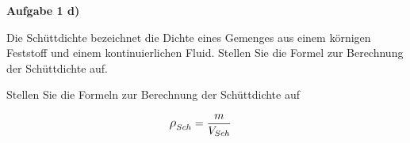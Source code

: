 \documentclass[aspectratio=169,9pt]{beamer}
\newcommand{\pp}{\par \vspace*{2mm}}
\newcommand{\antwort}[1]{
\begin{tcolorbox}[
	enhanced,
	colframe=unigrau!65,
	sharp corners,
	boxsep=1pt,
	colback=white,
	coltitle=black,
]
	#1
	\end{tcolorbox}
}
\begin{document}
\begin{frame}
\textbf{Aufgabe 1 d)}
\pp
\small
\begin{minipage}{.5\textwidth}
Die Schüttdichte bezeichnet die Dichte eines Gemenges aus einem körnigen Feststoff und einem kontinuierlichen Fluid. Stellen Sie die Formel zur Berechnung der Schüttdichte auf.
\pp 
Stellen Sie die Formeln zur Berechnung der Schüttdichte auf
\end{minipage}%
\hspace*{4mm}
\begin{minipage}{.5\textwidth}\pause
\antwort{
\begin{align*}
{\mathlarger \rho}_{Sch} &= \frac{m}{V_{Sch}}
\end{align*}
}
\end{minipage}
\end{frame}
\end{document}
